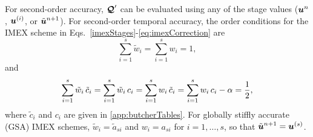 For second-order accuracy, $\boldsymbol{\mathcal{Q}}'$ can be evaluated using any of the stage values ($\boldsymbol{u}^{n}$, $\boldsymbol{u}^{(i)}$, or $\tilde{\boldsymbol{u}}^{n+1}$).  
For second-order temporal accuracy, the order conditions for the IMEX scheme in Eqs.~\eqref{imexStages}-\eqref{eq:imexCorrection} are
\begin{equation}
  \sum_{i=1}^{s}\tilde{w}_{i}=\sum_{i=1}^{s}w_{i}=1,
  \label{orderConditions1}
\end{equation}
and
\begin{equation}
  \sum_{i=1}^{s}\tilde{w}_{i}\,\tilde{c}_{i}
  =\sum_{i=1}^{s}\tilde{w}_{i}\,c_{i}
  =\sum_{i=1}^{s}w_{i}\,\tilde{c}_{i}
  =\sum_{i=1}^{s}w_{i}\,c_{i}-\alpha=\frac{1}{2}, 
  \label{orderConditions2}
\end{equation}
where $\tilde{c}_{i}$ and $c_{i}$ are given in \ref{app:butcherTables}.  
For globally stiffly accurate (GSA) IMEX schemes, $\tilde{w}_{i}=\tilde{a}_{si}$ and $w_{i}=a_{si}$ for $i=1,\ldots,s$, so that $\tilde{\boldsymbol{u}}^{n+1}=\boldsymbol{u}^{(s)}$.  

